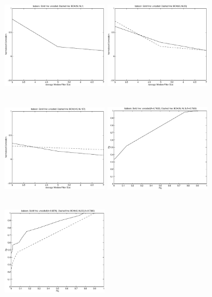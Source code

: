 \documentclass[12pt]{article}
\begin{document}
\pagestyle{empty}

\begin{figure}[p]
        \includegraphics[height=4.5cm,width=4.5cm]{plot1.eps}
        \includegraphics[height=4.5cm,width=4.5cm]{plot5.eps}
        \includegraphics[height=4.5cm,width=4.5cm]{plot9.eps}
        \includegraphics[height=4.5cm,width=4.5cm]{plot2.eps}
        \includegraphics[height=4.5cm,width=4.5cm]{plot6.eps}

\end{figure}
\end{document}
